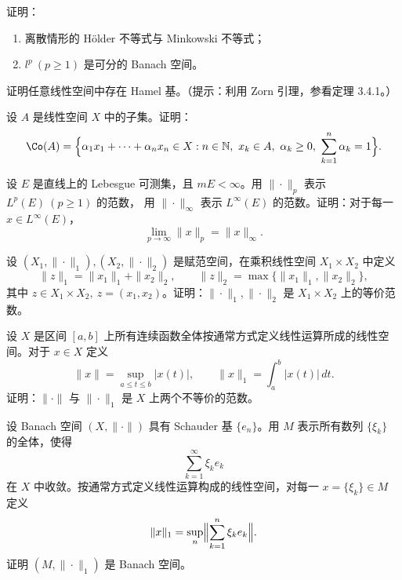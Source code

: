 \begin{homework}[2.9]
证明：
\begin{enumerate}
  \item 离散情形的 Hölder 不等式与 Minkowski 不等式；
  \item $l^p\ (p\ge1)$ 是可分的 Banach 空间。
\end{enumerate}
\end{homework}

\begin{homework}[2.10]
证明任意线性空间中存在 Hamel 基。（提示：利用 Zorn 引理，参看定理 3.4.1。）
\end{homework}

\begin{homework}[2.11]
设 $A$ 是线性空间 $X$ 中的子集。证明：
\[
\Co(A)
=\Bigl\{\alpha_1x_1+\cdots+\alpha_nx_n\in X:
n\in\mathbb{N},\ x_k\in A,\ \alpha_k\ge0,\ \sum_{k=1}^n\alpha_k=1\Bigr\}.
\]
\end{homework}

\begin{homework}[2.12]
设 $E$ 是直线上的 Lebesgue 可测集，且 $mE<\infty$。用 $\|\cdot\|_p$ 表示 $L^p(E)\ (p\ge1)$ 的范数，
用 $\|\cdot\|_\infty$ 表示 $L^\infty(E)$ 的范数。证明：对于每一 $x\in L^\infty(E)$，
\[
\lim_{p\to\infty}\|x\|_p=\|x\|_\infty.
\]
\end{homework}

\begin{homework}[2.13]
设 $(X_1,\|\cdot\|_1),(X_2,\|\cdot\|_2)$ 是赋范空间，在乘积线性空间 $X_1\times X_2$ 中定义
\[
\|z\|_1=\|x_1\|_1+\|x_2\|_2,\qquad
\|z\|_2=\max\{\|x_1\|_1,\|x_2\|_2\},
\]
其中 $z\in X_1\times X_2,\ z=(x_1,x_2)$。证明：$\|\cdot\|_1,\|\cdot\|_2$ 是 $X_1\times X_2$ 上的等价范数。
\end{homework}
\begin{homework}[2.14]
设 $X$ 是区间 $[a,b]$ 上所有连续函数全体按通常方式定义线性运算所成的线性空间。对于 $x\in X$ 定义
\[
\|x\| = \sup_{a\le t\le b} |x(t)|,\qquad
\|x\|_1 = \int_a^b |x(t)|\,dt.
\]
证明：$\|\cdot\|$ 与 $\|\cdot\|_1$ 是 $X$ 上两个不等价的范数。
\end{homework}

\begin{homework}[2.15]
设 Banach 空间 $(X,\|\cdot\|)$ 具有 Schauder 基 $\{e_n\}$。用 $M$ 表示所有数列 $\{\xi_k\}$ 的全体，使得
\[
\sum_{k=1}^{\infty} \xi_k e_k
\]
在 $X$ 中收敛。按通常方式定义线性运算构成的线性空间，对每一 $x=\{\xi_k\}\in M$ 定义
\[
\|x\|_1 = \sup_n \Bigl\|\sum_{k=1}^n \xi_k e_k\Bigr\|.
\]
证明 $(M,\|\cdot\|_1)$ 是 Banach 空间。
\end{homework}

